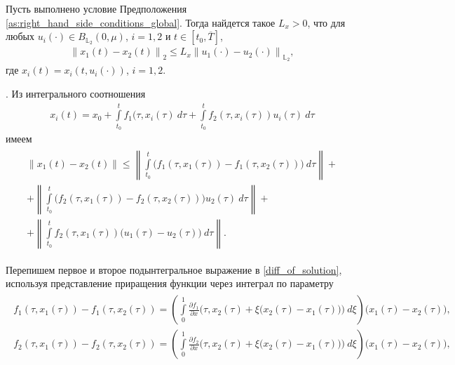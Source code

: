 \documentclass[../main.tex]{subfiles}
\begin{document}
	\begin{lemma}\label{lem:Lip_of_solutions_global}
			Пусть выполнено условие Предположения \ref{as:right_hand_side_conditions_global}. Тогда найдется такое $L_x > 0$, что для любых $u_i(\cdot) \in B_{\mathbb{L}_2}(0,\mu) $, $i = 1,2$ и $t \in [t_0, \overline{T}]$, 
			\begin{gather}
			\left\| x_1(t) - x_2(t) \right\|_2 \leqslant L_x \left\|u_1(\cdot) - u_2(\cdot) \right\|_{\mathbb{L}_2}, 
			\end{gather}
		где $x_i(t) = x_i(t,u_i(\cdot))$, $i = 1,2$. 
	\end{lemma}
	\doc. 
	Из интегрального соотношения
	\begin{gather*}
		 x_i(t) = x_0 + \int\limits_{t_0}^{t} f_1(\tau, x_i(\tau)\ d\tau + \int\limits_{t_0}^{t} f_2(\tau,x_i(\tau))u_i(\tau)\ d\tau 
	\end{gather*}
	имеем 
	\begin{gather}\label{diff_of_solution}
		\begin{gathered}
		\| x_1(t) - x_2(t) \| \leqslant 
		\left\|  \int\limits_{t_0}^{t} \Big( f_1(\tau, x_1(\tau)) - f_1(\tau, x_2(\tau)) \Big) \ d\tau \right\| +  \\ + 
		\left\|  \int\limits_{t_0}^{t} \Big( f_2(\tau, x_1(\tau)) - f_2(\tau,x_2(\tau)) \Big) u_2(\tau) \ d\tau \right\| + \\ +
		\left\|  \int\limits_{t_0}^{t} f_2(\tau,x_1(\tau)) \big( u_1(\tau) - u_2(\tau) \big) \ d\tau \right\|. 
		\end{gathered}
	\end{gather}
	
	Перепишем первое и второе подынтегральное выражение в \eqref{diff_of_solution}, используя представление приращения функции через интеграл по параметру
	\begin{gather}\label{sec1:meanvalue}
		\begin{gathered}
		f_1(\tau, x_1(\tau)) - f_1(\tau, x_2(\tau)) = \left(  \int\limits_0^1 \frac{\partial f_1}{\partial x} \Big(\tau, x_2(\tau) + \xi \big(x_2(\tau) - x_1(\tau)\big)\Big) \ d\xi \right) \big(x_1(\tau) - x_2(\tau)\big), \\ 
		f_2(\tau, x_1(\tau)) - f_2(\tau, x_2(\tau)) = \left(  \int\limits_0^1 \frac{\partial f_2}{\partial x} \Big(\tau, x_2(\tau) + \xi \big(x_2(\tau) - x_1(\tau)\big)\Big) \ d\xi \right) \big(x_1(\tau) - x_2(\tau)\big), 
		\end{gathered}
	\end{gather}
	
\end{document}
